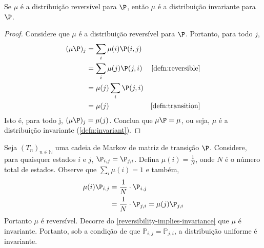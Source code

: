 \begin{lemma}
 \label{reversibility-implies-invariance}
 Se $\mu$ é a distribuição reversível para $\P$, 
 então $\mu$ é a distribuição invariante para $\P$. 
\end{lemma}
 
\begin{proof}
 Considere que $\mu$ é a distribuição reversível
 para $\P$. Portanto, para todo $j$,
 \begin{align*}
  (\mu \P)_{j}
  &= \sum_{i}{\mu(i)\P(i,j)} \\
  &= \sum_{i}{\mu(j)\P(j,i)}
  & \text{\cref{defn:reversible}} \\
  &= \mu(j)\sum_{i}{\P(j,i)} \\
  &= \mu(j)
  & \text{\cref{defn:transition}}
 \end{align*}
 Isto é, para todo j, $(\mu \P)_{j} = \mu(j)$.
 Conclua que $\mu \P = \mu$, ou seja,
 $\mu$ é a distribuição invariante
 (\cref{defn:invariant}).
\end{proof}

\begin{example}
 Seja $(T_{n})_{n \in \mathbb{N}}$ uma 
 cadeia de Markov de matriz de transição $\P$. 
 Considere, para quaisquer estados $i$ e $j$, 
 $\P_{i,j} = \P_{j,i}$. 
 Defina $\mu(i) = \frac{1}{N}$, onde
 $N$ é o número total de estados.
 Observe que $\sum_{i}{\mu(i)} = 1$ e também,
 \begin{align*}
  \mu(i) \P_{i,j}
  &= \frac{1}{N} \cdot \P_{i,j} \\
  &= \frac{1}{N} \cdot \P_{j,i}
  = \mu(j) \P_{j,i}
 \end{align*}
 Portanto $\mu$ é reversível.
 Decorre do \cref{reversibility-implies-invariance}
 que $\mu$ é invariante. 
 Portanto, sob a condição de que $\mathbb{P}_{i,j} = \mathbb{P}_{j,i}$,
 a distribuição uniforme é invariante. 
\end{example}

